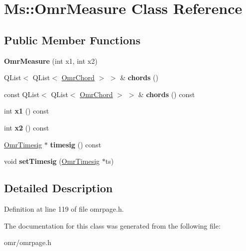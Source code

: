 \hypertarget{class_ms_1_1_omr_measure}{}\section{Ms\+:\+:Omr\+Measure Class Reference}
\label{class_ms_1_1_omr_measure}
\subsection*{Public Member Functions}
\begin{DoxyCompactItemize}
\item 
\mbox{\label{class_ms_1_1_omr_measure_a2f9e8c8b56e2a6dc37a5bee1705585f3}} 
{\bfseries Omr\+Measure} (int x1, int x2)
\item 
\mbox{\label{class_ms_1_1_omr_measure_a5223db59ea380a6a392c51c309b9b449}} 
Q\+List$<$ Q\+List$<$ \hyperlink{class_ms_1_1_omr_chord}{Omr\+Chord} $>$ $>$ \& {\bfseries chords} ()
\item 
\mbox{\label{class_ms_1_1_omr_measure_a48b7dd189f4ae839fecd8a17f38bddf2}} 
const Q\+List$<$ Q\+List$<$ \hyperlink{class_ms_1_1_omr_chord}{Omr\+Chord} $>$ $>$ \& {\bfseries chords} () const
\item 
\mbox{\label{class_ms_1_1_omr_measure_aba923e55a35d4dba29c23252bb5d6ed6}} 
int {\bfseries x1} () const
\item 
\mbox{\label{class_ms_1_1_omr_measure_a7f9609246e09f4deb8ecb24be9e1b947}} 
int {\bfseries x2} () const
\item 
\mbox{\label{class_ms_1_1_omr_measure_a91d93ec60836f5ce4b1e3bfd919d1c03}} 
\hyperlink{class_ms_1_1_omr_timesig}{Omr\+Timesig} $\ast$ {\bfseries timesig} () const
\item 
\mbox{\label{class_ms_1_1_omr_measure_adb87f6e0f735bbb98bb9e1a903f9a668}} 
void {\bfseries set\+Timesig} (\hyperlink{class_ms_1_1_omr_timesig}{Omr\+Timesig} $\ast$ts)
\end{DoxyCompactItemize}


\subsection{Detailed Description}


Definition at line 119 of file omrpage.\+h.



The documentation for this class was generated from the following file\+:\begin{DoxyCompactItemize}
\item 
omr/omrpage.\+h\end{DoxyCompactItemize}
